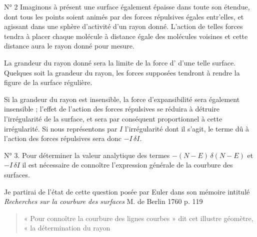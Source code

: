 \documentclass[11pt,a4paper]{article}
\begin{document}
N° 2 Imaginons à présent une surface également épaisse dans toute son étendue,
dont tous les points soient animés par des forces répulsives égales
entr'elles, et agissant dans une sphère d'activité d'un rayon donné. L'action
de telles forces tendra à placer chaque molécule à distance égale des
molécules voisines et cette distance aura le rayon donné pour mesure.

La grandeur du rayon donné sera la limite de la force
d'\emph{} d'une telle surface. Quelques soit
 la grandeur du rayon, les forces supposées tendront à
rendre la figure de la surface régulière.

Si la grandeur du rayon est insensible, la force d'expansibilité sera
également insensible ; l'effet de l'action des forces répulsives se réduira à
détruire l'irrégularité de la surface, et sera par conséquent proportionnel à
cette irrégularité. Si nous représentons par $I$ l'irrégularité dont il
s'agit, le terme dû à l'action des forces répulsives sera donc
$-I\,\delta I$.

N° 3. Pour déterminer la valeur analytique des termes $-(N-E)\,\delta(N-E)$ et
$-I\,\delta I$ il est nécessaire de connoître l'expression générale de la
courbure des surfaces.

Je partirai de l'état de cette question posée par Euler dans son mémoire
intitulé \emph{Recherches sur la courbure des surfaces} M. de Berlin 1760
p. 119

\begin{quote}
« Pour connoître la courbure des lignes courbes » dit cet illustre géomètre,
« la détermination du rayon
\end{quote}
\end{document}

